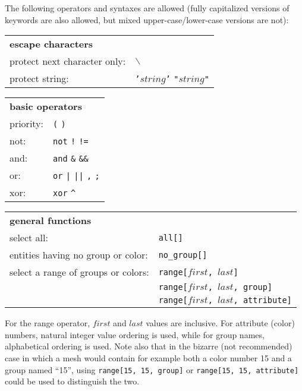{{{The following operators and syntaxes are allowed (fully capitalized
versions of keywords are also allowed, but mixed upper-case/lower-case
versions are not):

\begin{tabular}[top]{p{6cm} l}
\multicolumn{2}{l}{\bf escape characters }\\
protect next character only: & \texttt{$\backslash$} \\
protect string:              & \texttt{{'}$string${'}} \quad \texttt{"$string$"}\\
\end{tabular}

\begin{tabular}[top]{p{6cm} l}
\multicolumn{2}{l}{\bf basic operators }\\
priority: & \texttt{(} \quad \texttt{)} \\
not:      &  \texttt{not} \quad \texttt{!} \quad \texttt{!=} \\
and:      &  \texttt{and} \quad \texttt{\&} \quad \texttt{\&\&} \\
or:       &  \texttt{or} \quad \texttt{|} \quad \texttt{||} \quad \texttt{,} \quad \texttt{;} \\
xor:      &  \texttt{xor} \quad \texttt{\^} \\
\end{tabular}

\begin{tabular}[top]{p{6cm} l}
\multicolumn{2}{l}{\bf general functions }\\
select all:                        &  \texttt{all[]}\\
entities having no group or color: &  \texttt{no\_group[]} \\
select a range of groups or colors: &  \texttt{range[$first$, $last$]} \\
                                    &  \texttt{range[$first$, $last$, group]} \\
                                    &  \texttt{range[$first$, $last$, attribute]} \\
\end{tabular}

For the range operator, $first$ and $last$ values are inclusive.
For attribute (color) numbers, natural integer value ordering is used,
while for group names, alphabetical ordering is used. Note also that in
the bizarre (not recommended) case in which a mesh would contain for
example both a color number 15 and a group named ``15'', using
\texttt{range[15, 15, group]} or \texttt{range[15, 15, attribute]}
could be used to distinguish the two.

}}}
